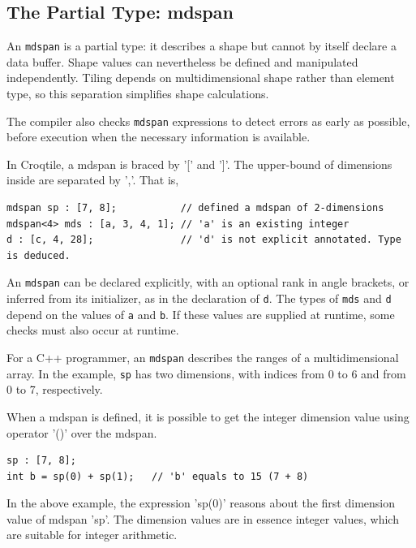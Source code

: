 \subsection*{The Partial Type: \textbf{mdspan}}

An \texttt{mdspan} is a partial type: it describes a shape but cannot by itself declare a data buffer. Shape values can nevertheless be defined and manipulated independently. Tiling depends on multidimensional shape rather than element type, so this separation simplifies shape calculations.

The compiler also checks \texttt{mdspan} expressions to detect errors as early as possible, before execution when the necessary information is available.

In Croqtile, a mdspan is braced by '[' and ']'. The upper-bound of dimensions inside are separated by ','. That is,

\begin{lstlisting}[language=croqtile,caption={An mdspan declaration}]
mdspan sp : [7, 8];           // defined a mdspan of 2-dimensions
mdspan<4> mds : [a, 3, 4, 1]; // 'a' is an existing integer
d : [c, 4, 28];               // 'd' is not explicit annotated. Type is deduced.
\end{lstlisting}

An \texttt{mdspan} can be declared explicitly, with an optional rank in angle brackets, or inferred from its initializer, as in the declaration of \texttt{d}. The types of \texttt{mds} and \texttt{d} depend on the values of \texttt{a} and \texttt{b}. If these values are supplied at runtime, some checks must also occur at runtime.

For a C++ programmer, an \texttt{mdspan} describes the ranges of a multidimensional array. In the example, \texttt{sp} has two dimensions, with indices from 0 to 6 and from 0 to 7, respectively.

When a mdspan is defined, it is possible to get the integer dimension value using operator '()' over the mdspan.

\begin{lstlisting}[language=croqtile,caption={A shape literal}]
sp : [7, 8];
int b = sp(0) + sp(1);   // 'b' equals to 15 (7 + 8)
\end{lstlisting}

In the above example, the expression 'sp(0)' reasons about the first dimension value of mdspan 'sp'. The dimension values are in essence integer values, which are suitable for integer arithmetic.

